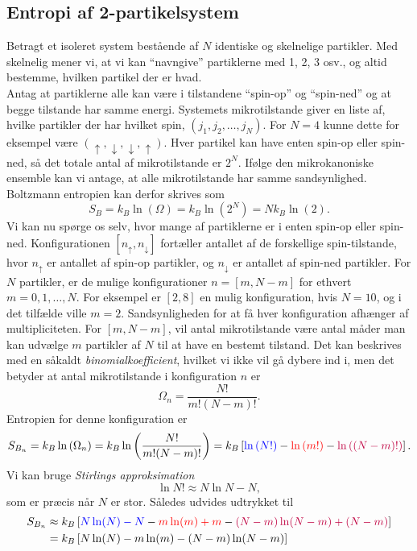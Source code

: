 \subsection{Entropi af 2-partikelsystem}
Betragt et isoleret system bestående af $N$ identiske og skelnelige partikler. Med skelnelig mener vi, at vi kan ``navngive'' partiklerne med 1, 2, 3 osv., og altid bestemme, hvilken partikel der er hvad.\\
Antag at partiklerne alle kan være i tilstandene ``spin-op'' og ``spin-ned'' og at begge tilstande har samme energi. Systemets mikrotilstande giver en liste af, hvilke partikler der har hvilket spin, $(j_1,j_2,\dots,j_N)$. For $N=4$ kunne dette for eksempel være $(\uparrow,\downarrow,\downarrow,\uparrow)$. Hver partikel kan have enten spin-op eller spin-ned, så det totale antal af mikrotilstande er $2^N$. Ifølge den mikrokanoniske ensemble kan vi antage, at alle mikrotilstande har samme sandsynlighed. Boltzmann entropien kan derfor skrives som
\[ S_B=k_B\ln{(\Omega)}=k_B\ln{\left(2^N\right)}=Nk_B\ln{(2)}. \]
Vi kan nu spørge os selv, hvor mange af partiklerne er i enten spin-op eller spin-ned. Konfigurationen $[n_\uparrow,n_\downarrow]$ fortæller antallet af de forskellige spin-tilstande, hvor $n_\uparrow$ er antallet af spin-op partikler, og $n_\downarrow$ er antallet af spin-ned partikler. For $N$ partikler, er de mulige konfigurationer $n=[m,N-m]$ for ethvert $m=0,1,\dots,N$. For eksempel er $[2,8]$ en mulig konfiguration, hvis $N=10$, og i det tilfælde ville $m=2$. Sandsynligheden for at få hver konfiguration afhænger af multipliciteten. For $[m,N-m]$, vil antal mikrotilstande være antal måder man kan udvælge $m$ partikler af $N$ til at have en bestemt tilstand. Det kan beskrives med en såkaldt \emph{binomialkoefficient}, hvilket vi ikke vil gå dybere ind i, men det betyder at antal mikrotilstande i konfiguration $n$ er
\[ \Omega_n=\frac{N!}{m!(N-m)!}. \]
Entropien for denne konfiguration er
\[ S_{B_n}=k_B\ln{(\Omega_n)}=k_B\ln\left(\frac{N!}{m!(N-m)!}\right)=k_B\left[\textcolor{blue}{\ln{(N!)}}-\textcolor{red}{\ln{(m!)}}-\textcolor{purple}{\ln{((N-m)!)}}\right]. \]
Vi kan bruge \emph{Stirlings approksimation} %
\begin{equation}
	\ln N!\approx N\ln N - N,
\end{equation}
som er præcis når $N$ er stor. Således udvides udtrykket til
\begin{equation*}
	\begin{split}
		S_{B_n}&\approx k_B\left[\textcolor{blue}{ N\ln (N)-N}-\textcolor{red}{m\ln (m)+m}-\textcolor{purple}{(N-m)\ln(N-m)+(N-m)}\right]\\
		&=k_B\left[N\ln (N)-m\ln (m)-(N-m)\ln(N-m)\right]
	\end{split}
\end{equation*}
